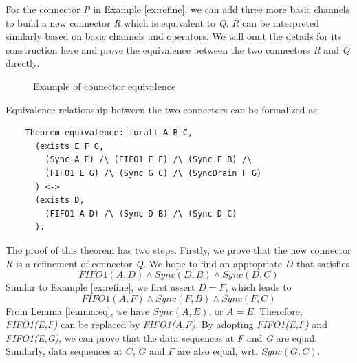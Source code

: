 \documentclass{llncs}
\begin{document}
\begin{example}[Equivalence]
For the connector \emph{P} in Example \ref{ex:refine}, we can add three more basic channels to build a new connector \emph{R} which is equivalent to \emph{Q}. \emph{R} can be interpreted similarly based on basic channels and operators. We will omit the details for its construction here and prove the equivalence between the two connectors \emph{R} and \emph{Q} directly.

\begin{figure}
\vspace{0cm}
\centering
{}
\caption{Example of connector equivalence}
\label{refine1}

\end{figure}

Equivalence relationship between the two connectors can be formalized as:
\begin{verbatim}
    Theorem equivalence: forall A B C,
      (exists E F G,
        (Sync A E) /\ (FIFO1 E F) /\ (Sync F B) /\
        (FIFO1 E G) /\ (Sync G C) /\ (SyncDrain F G)
      ) <->
      (exists D,
        (FIFO1 A D) /\ (Sync D B) /\ (Sync D C)
      ).
\end{verbatim}
The proof of this theorem has two steps. Firstly, we prove that the new connector \emph{R} is a refinement of connector \emph{Q}.
We hope to find an appropriate \emph{$D$} that satisfies
\[
FIFO1(A,D)\wedge Sync(D,B) \wedge Sync(D,C)
\]
Similar to Example \ref{ex:refine}, we first assert $D=F$, which leads to
\[
FIFO1(A,F) \land Sync(F,B) \wedge Sync(F,C)
\]
From Lemma \ref{lemma:eq}, we have $Sync(A,E)$, or $A=E$. Therefore, \emph{FIFO1(E,F)} can be replaced by \emph{FIFO1(A,F)}. By adopting \emph{FIFO1(E,F)} and \emph{FIFO1(E,G)}, we can prove that the data sequences at \emph{F} and \emph{G} are equal. Similarly, data sequences at $C$, $G$ and $F$ are also equal, wrt. $Sync(G,C)$.


\end{example}
\end{document}
